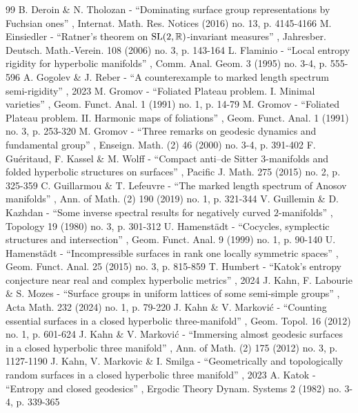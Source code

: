 \begin{thebibliography}{99}
 B. Deroin \& N. Tholozan - “Dominating surface group representations by Fuchsian ones” , Internat. Math. Res. Notices (2016) no. 13, p. 4145-4166
 M. Einsiedler - “Ratner’s theorem on ${\rm SL}(2,\mathbb{R})$-invariant measures” , Jahresber. Deutsch. Math.-Verein. 108 (2006) no. 3, p. 143-164
 L. Flaminio - “Local entropy rigidity for hyperbolic manifolds” , Comm. Anal. Geom. 3 (1995) no. 3-4, p. 555-596
 A. Gogolev \& J. Reber - “A counterexample to marked length spectrum semi-rigidity” , 2023
 M. Gromov - “Foliated Plateau problem. I. Minimal varieties” , Geom. Funct. Anal. 1 (1991) no. 1, p. 14-79
 M. Gromov - “Foliated Plateau problem. II. Harmonic maps of foliations” , Geom. Funct. Anal. 1 (1991) no. 3, p. 253-320
 M. Gromov - “Three remarks on geodesic dynamics and fundamental group” , Enseign. Math. (2) 46 (2000) no. 3-4, p. 391-402
 F. Guéritaud, F. Kassel \& M. Wolff - “Compact anti–de Sitter 3-manifolds and folded hyperbolic structures on surfaces” , Pacific J. Math. 275 (2015) no. 2, p. 325-359
 C. Guillarmou \& T. Lefeuvre - “The marked length spectrum of Anosov manifolds” , Ann. of Math. (2) 190 (2019) no. 1, p. 321-344
 V. Guillemin \& D. Kazhdan - “Some inverse spectral results for negatively curved $2$-manifolds” , Topology 19 (1980) no. 3, p. 301-312
 U. Hamenstädt - “Cocycles, symplectic structures and intersection” , Geom. Funct. Anal. 9 (1999) no. 1, p. 90-140
 U. Hamenstädt - “Incompressible surfaces in rank one locally symmetric spaces” , Geom. Funct. Anal. 25 (2015) no. 3, p. 815-859
 T. Humbert - “Katok’s entropy conjecture near real and complex hyperbolic metrics” , 2024
 J. Kahn, F. Labourie \& S. Mozes - “Surface groups in uniform lattices of some semi-simple groups” , Acta Math. 232 (2024) no. 1, p. 79-220
 J. Kahn \& V. Marković - “Counting essential surfaces in a closed hyperbolic three-manifold” , Geom. Topol. 16 (2012) no. 1, p. 601-624
 J. Kahn \& V. Marković - “Immersing almost geodesic surfaces in a closed hyperbolic three manifold” , Ann. of Math. (2) 175 (2012) no. 3, p. 1127-1190
 J. Kahn, V. Markovic \& I. Smilga - “Geometrically and topologically random surfaces in a closed hyperbolic three manifold” , 2023
 A. Katok - “Entropy and closed geodesics” , Ergodic Theory Dynam. Systems 2 (1982) no. 3-4, p. 339-365

\end{thebibliography}
